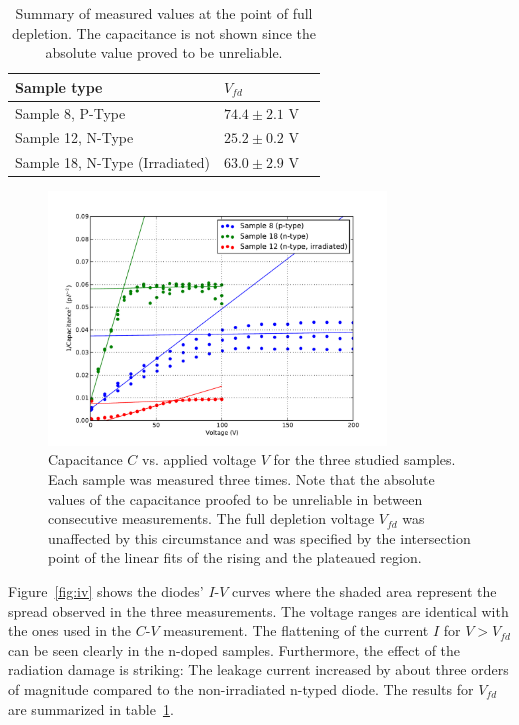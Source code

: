 \documentclass[11pt,a4paper]{report}
\begin{document}
\begin{table}
  \caption{Summary of measured values at the point of full depletion. The capacitance is not shown since the absolute value proved to be unreliable.}\label{tab:results}
  \centering
  \begin{tabular}{lll}
    \toprule
    Sample type         & $V_{fd}$  \\
    \midrule
    Sample 8, P-Type              & $74.4 \pm 2.1$ V       \\
    Sample 12, N-Type              & $25.2 \pm 0.2$ V      \\
    Sample 18, N-Type (Irradiated) & $63.0 \pm 2.9$ V      \\
    \bottomrule
  \end{tabular}
\end{table}



\label{sec:results}
\begin{figure}
  \centering
  \includegraphics[width=0.8\textwidth]{./figures/cv.pdf}  
  \caption{Capacitance $C$ vs. applied voltage $V$ for the three studied samples. Each sample was measured three times. Note that the absolute values of the capacitance proofed to be unreliable in between consecutive measurements. The full depletion voltage $V_{fd}$ was unaffected by this circumstance and was specified by the intersection point of the linear fits of the rising and the plateaued region.}\label{fig:cv}
\end{figure}

Figure~\ref{fig:iv} shows the diodes' $I$-$V$ curves where the shaded area represent the spread observed in the three measurements.
The voltage ranges are identical with the ones used in the $C$-$V$ measurement.
The flattening of the current $I$ for $V>V_{fd}$ can be seen clearly in the n-doped samples.
Furthermore, the effect of the radiation damage is striking: The leakage current increased by about three orders of magnitude compared to the non-irradiated n-typed diode. The results for $V_{fd}$ are summarized in table~\ref{tab:results}.
\end{document}
